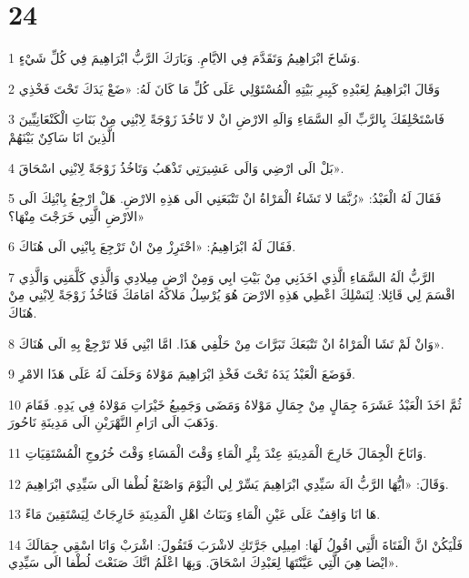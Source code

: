 \chapter{24}

\par 1 وَشَاخَ ابْرَاهِيمُ وَتَقَدَّمَ فِي الايَّامِ. وَبَارَكَ الرَّبُّ ابْرَاهِيمَ فِي كُلِّ شَيْءٍ.
\par 2 وَقَالَ ابْرَاهِيمُ لِعَبْدِهِ كَبِيرِ بَيْتِهِ الْمُسْتَوْلِي عَلَى كُلِّ مَا كَانَ لَهُ: «ضَعْ يَدَكَ تَحْتَ فَخْذِي
\par 3 فَاسْتَحْلِفَكَ بِالرَّبِّ الَهِ السَّمَاءِ وَالَهِ الارْضِ انْ لا تَاخُذَ زَوْجَةً لِابْنِي مِنْ بَنَاتِ الْكَنْعَانِيِّينَ الَّذِينَ انَا سَاكِنٌ بَيْنَهُمْ
\par 4 بَلْ الَى ارْضِي وَالَى عَشِيرَتِي تَذْهَبُ وَتَاخُذُ زَوْجَةً لِابْنِي اسْحَاقَ».
\par 5 فَقَالَ لَهُ الْعَبْدُ: «رُبَّمَا لا تَشَاءُ الْمَرْاةُ انْ تَتْبَعَنِي الَى هَذِهِ الارْضِ. هَلْ ارْجِعُ بِابْنِكَ الَى الارْضِ الَّتِي خَرَجْتَ مِنْهَا؟»
\par 6 فَقَالَ لَهُ ابْرَاهِيمُ: «احْتَرِزْ مِنْ انْ تَرْجِعَ بِابْنِي الَى هُنَاكَ.
\par 7 الرَّبُّ الَهُ السَّمَاءِ الَّذِي اخَذَنِي مِنْ بَيْتِ ابِي وَمِنْ ارْضِ مِيلادِي وَالَّذِي كَلَّمَنِي وَالَّذِي اقْسَمَ لِي قَائِلا: لِنَسْلِكَ اعْطِي هَذِهِ الارْضَ هُوَ يُرْسِلُ مَلاكَهُ امَامَكَ فَتَاخُذُ زَوْجَةً لِابْنِي مِنْ هُنَاكَ.
\par 8 وَانْ لَمْ تَشَا الْمَرْاةُ انْ تَتْبَعَكَ تَبَرَّاتَ مِنْ حَلْفِي هَذَا. امَّا ابْنِي فَلا تَرْجِعْ بِهِ الَى هُنَاكَ».
\par 9 فَوَضَعَ الْعَبْدُ يَدَهُ تَحْتَ فَخْذِ ابْرَاهِيمَ مَوْلاهُ وَحَلَفَ لَهُ عَلَى هَذَا الامْرِ.
\par 10 ثُمَّ اخَذَ الْعَبْدُ عَشَرَةَ جِمَالٍ مِنْ جِمَالِ مَوْلاهُ وَمَضَى وَجَمِيعُ خَيْرَاتِ مَوْلاهُ فِي يَدِهِ. فَقَامَ وَذَهَبَ الَى ارَامِ النَّهْرَيْنِ الَى مَدِينَةِ نَاحُورَ.
\par 11 وَانَاخَ الْجِمَالَ خَارِجَ الْمَدِينَةِ عِنْدَ بِئْرِ الْمَاءِ وَقْتَ الْمَسَاءِ وَقْتَ خُرُوجِ الْمُسْتَقِيَاتِ.
\par 12 وَقَالَ: «ايُّهَا الرَّبُّ الَهَ سَيِّدِي ابْرَاهِيمَ يَسِّرْ لِي الْيَوْمَ وَاصْنَعْ لُطْفا الَى سَيِّدِي ابْرَاهِيمَ.
\par 13 هَا انَا وَاقِفٌ عَلَى عَيْنِ الْمَاءِ وَبَنَاتُ اهْلِ الْمَدِينَةِ خَارِجَاتٌ لِيَسْتَقِينَ مَاءً.
\par 14 فَلْيَكُنْ انَّ الْفَتَاةَ الَّتِي اقُولُ لَهَا: امِيلِي جَرَّتَكِ لاشْرَبَ فَتَقُولَ: اشْرَبْ وَانَا اسْقِي جِمَالَكَ ايْضا هِيَ الَّتِي عَيَّنْتَهَا لِعَبْدِكَ اسْحَاقَ. وَبِهَا اعْلَمُ انَّكَ صَنَعْتَ لُطْفا الَى سَيِّدِي».
